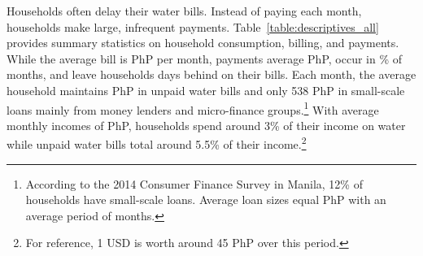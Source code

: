 \documentclass[12pt,table]{article}
\begin{document}
Households often delay their water bills.  Instead of paying each month, households make large, infrequent payments.  Table~\ref{table:descriptives_all} provides summary statistics on household consumption, billing, and payments.  While the average bill is PhP per month, payments average PhP, occur in \unskip\% of months, and leave households days behind on their bills.  Each month, the average household maintains PhP in unpaid water bills and only 538 PhP in small-scale loans mainly from money lenders and micro-finance groups.\footnote{According to the 2014 Consumer Finance Survey in Manila, 12\% of households have small-scale loans.  Average loan sizes equal PhP with an average period of months.}   With average monthly incomes of PhP, households spend around 3\% of their income on water while unpaid water bills total around 5.5\% of their income.\footnote{For reference, 1 USD is worth around 45 PhP over this period.}   
\end{document}
